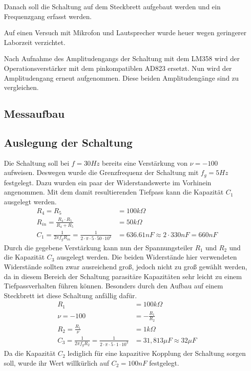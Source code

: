Danach soll die Schaltung auf dem Steckbrett aufgebaut werden und ein Frequenzgang erfasst werden.

Auf einen Versuch mit Mikrofon und Lautsprecher wurde heuer wegen geringerer Laborzeit verzichtet. 

Nach Aufnahme des Amplitudengangs der Schaltung mit dem LM358 wird der Operationsverstärker mit dem pinkompatiblen AD823 ersetzt. Nun wird der Amplitudengang erneut aufgenommen. Diese beiden Amplitudengänge sind zu vergleichen. 

\subsection{Messaufbau}
\subsection{Auslegung der Schaltung}
Die Schaltung soll bei $f=30Hz$ bereits eine Verstärkung von $\nu = -100$ aufweisen. Deswegen wurde die Grenzfrequenz der Schaltung mit $f_g=5Hz$ festgelegt. 
Dazu wurden ein paar der Widerstandswerte im Vorhinein angenommen. Mit dem damit resultierenden Tiefpass kann die Kapazität $C_1$ ausgelegt werden.
\begin{align}
    R_4=R_5 &= 100k\Omega \\
    R_{in} = \frac{R_4\cdot R_5}{R_4+ R_5} &= 50k\Omega \\
    C_1=\frac{1}{2\pi f_g R_{in}} = \frac{1}{2\cdot \pi \cdot 5\cdot50\cdot 10^3} &= 636.61nF \approx 2\cdot 330nF = 660nF
\end{align}
Durch die gegebene Verstärkung kann nun der Spannungsteiler $R_1$ und $R_2$ und die Kapazität $C_3$ ausgelegt werden. Die beiden Widerstände hier verwendeten Widerstände sollten zwar ausreichend groß, jedoch nicht zu groß gewählt werden, da in diesem Bereich der Schaltung parasitäre Kapazitäten sehr leicht zu einem Tiefpassverhalten führen können. Besonders durch den Aufbau auf einem Steckbrett ist diese Schaltung anfällig dafür. 
\begin{align}
    R_1 &= 100k\Omega\\
    \nu = -100 &= -\frac{R_1}{R_2} \\
    R_2 = \frac{R_1}{\nu} &= 1k\Omega\\
    C_3=\frac{1}{2\pi f_g R_2} = \frac{1}{2\cdot \pi \cdot 5\cdot1\cdot 10^3} &= 31,813\mu F \approx 32\mu F
\end{align}
Da die Kapazität $C_2$ lediglich für eine kapazitive Kopplung der Schaltung sorgen soll, wurde ihr Wert willkürlich auf $C_2=100nF$ festgelegt. 

